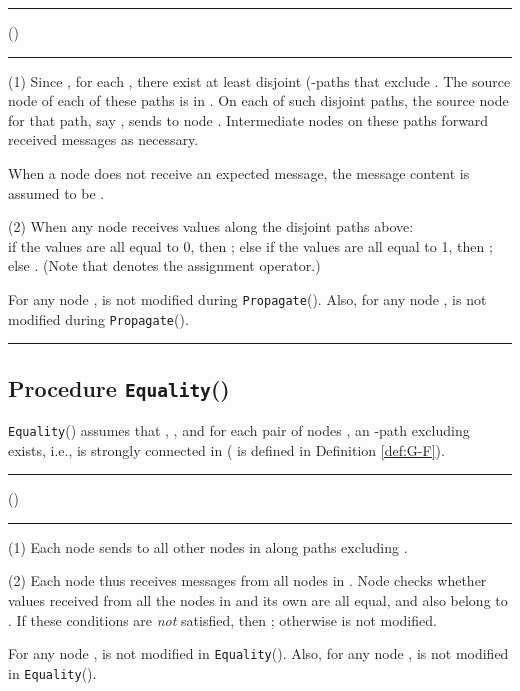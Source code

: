 \documentclass[letterpaper, 11pt]{article}
\newcommand{\Propagate}{{\tt Propagate}}
\newcommand{\Equality}{{\tt Equality}}
\begin{document}
\vspace*{2pt}
\hrule
\vspace*{2pt}
\noindent \Propagate()
\vspace*{4pt}
\hrule
\vspace*{-2pt}
\begin{list}{}{}
\item[(1)]
Since , for each , there
exist at least  disjoint (-paths that exclude .
The source node of each of these paths is in .
On each of  such disjoint paths, the source node for that path, say , sends  to node . Intermediate nodes on these paths forward
received messages as necessary. 

When a node does not receive an expected message,
the message content is assumed to be .

\item[(2)] When any node  receives  values along the 
disjoint paths above:\\
 if the  values are all equal to 0, then
; else if the  values are all equal to 1, then
; else . \hfill (Note that  denotes the assignment operator.)
\end{list}
For any node ,  is not modified during \Propagate().
Also, for any node ,  is not modified during \Propagate().

\vspace*{4pt}
\hrule



\subsection{Procedure \Equality()}
\label{ss_equality}

\Equality() assumes that , ,
and for each pair of nodes ,
an -path excluding  exists, i.e.,  is strongly connected
in  ( is defined in Definition \ref{def:G-F}).




\vspace*{2pt}
\hrule
\vspace*{2pt}
\noindent \Equality()
\vspace*{4pt}
\hrule
\begin{list}{}{}
\item[(1)] Each node  sends  to all other nodes
in  along paths excluding .
\item[(2)] Each node  thus receives messages from all nodes in .
Node  checks whether values received from all the nodes in  and
its own  are all equal, and also belong to .
If these conditions are {\em not} satisfied, then ; otherwise  is not modified.



\end{list}
For any node ,  is not modified in \Equality().
Also, for any node ,  is not modified in \Equality().
\end{document}

